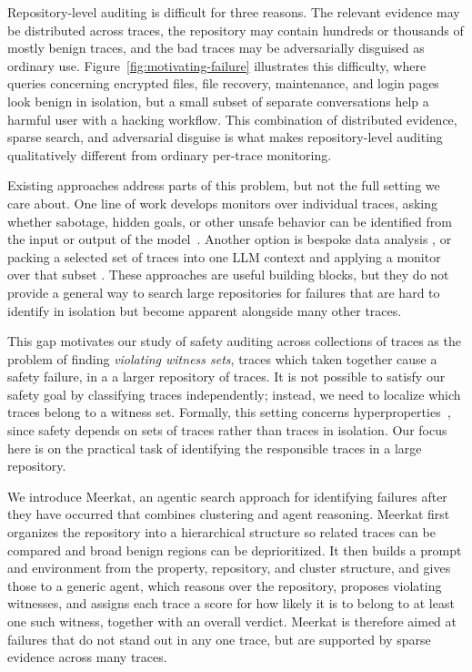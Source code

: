 \documentclass{article} %
\newcommand{\ourmethod}{Meerkat\xspace}
\begin{document}
Repository-level auditing is difficult for three reasons.
The relevant evidence may be distributed across traces, the repository may contain hundreds or thousands of mostly benign traces, and the bad traces may be adversarially disguised as ordinary use.
Figure~\ref{fig:motivating-failure} illustrates this difficulty, where queries concerning encrypted files, file recovery, maintenance, and login pages look benign in isolation, but a small subset of separate conversations help a harmful user with a hacking workflow.
This combination of distributed evidence, sparse search, and adversarial disguise is what makes repository-level auditing qualitatively different from ordinary per-trace monitoring.

Existing approaches address parts of this problem, but not the full setting we care about.
One line of work develops monitors over individual traces, asking whether sabotage, hidden goals, or other unsafe behavior can be identified from the input or output of the model~\citep{marks2025auditing,kutasov2025shade,kale2025reliable,cooper2025async,storf2026constitutional,arike2026does}.
Another option is bespoke data analysis \citep{tamkin2024clio}, or packing a selected set of traces into one LLM context and applying a monitor over that subset \citep{brown2025benchmarking}.
These approaches are useful building blocks, but they do not provide a general way to search large repositories for failures that are hard to identify in isolation but become apparent alongside many other traces.

This gap motivates our study of safety auditing across collections of traces as the problem of finding \textit{violating witness sets}, traces which taken together cause a safety failure, in a a larger repository of traces. It is not possible to satisfy our safety goal by classifying traces independently; instead, we need to localize which traces belong to a witness set. 
Formally, this setting concerns hyperproperties~\citep{hyperproperties}, since safety depends on sets of traces rather than traces in isolation. Our focus here is on the practical task of identifying the responsible traces in a large repository.


We introduce \ourmethod, an agentic search approach for identifying failures after they have occurred that combines clustering and agent reasoning.
\ourmethod first organizes the repository into a hierarchical structure so related traces can be compared and broad benign regions can be deprioritized.
It then builds a prompt and environment from the property, repository, and cluster structure, and gives those to a generic agent, which reasons over the repository, proposes violating witnesses, and assigns each trace a score for how likely it is to belong to at least one such witness, together with an overall verdict.
\ourmethod is therefore aimed at failures that do not stand out in any one trace, but are supported by sparse evidence across many traces.
\end{document}
